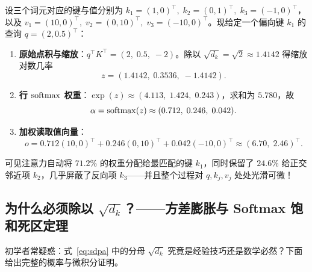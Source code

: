\begin{example}[手算迷你示例：$T=3,\; d_k=d_v=2$ 的软词典检索]
\label{ex:sdpa-hand}
设三个词元对应的键与值分别为 $k_1 = (1, 0)^\top,\; k_2 = (0, 1)^\top,\; k_3 = (-1, 0)^\top$，以及 $v_1 = (10, 0)^\top,\; v_2 = (0, 10)^\top,\; v_3 = (-10, 0)^\top$。现给定一个偏向键 $k_1$ 的查询 $q = (2, 0.5)^\top$：
\begin{enumerate}
  \item \textbf{原始点积与缩放}：$q^\top K^\top = (2,\; 0.5,\; -2)$。除以 $\sqrt{d_k} = \sqrt{2} \approx 1.4142$ 得缩放对数几率
  \[
    z = (1.4142,\; 0.3536,\; -1.4142).
  \]
  \item \textbf{行 $\operatorname{softmax}$ 权重}：$\exp(z) \approx (4.113,\; 1.424,\; 0.243)$，求和为 $5.780$，故
  \[
    \alpha = \operatorname{softmax}(z) \approx (0.712,\; 0.246,\; 0.042).
  \]
  \item \textbf{加权读取值向量}：
  \[
    o = 0.712 (10, 0)^\top + 0.246 (0, 10)^\top + 0.042 (-10, 0)^\top \approx (6.70,\; 2.46)^\top.
  \]
\end{enumerate}
可见注意力自动将 $71.2\%$ 的权重分配给最匹配的键 $k_1$，同时保留了 $24.6\%$ 给正交邻近项 $k_2$，几乎屏蔽了反向项 $k_3$——并且整个过程对 $q, k_j, v_j$ 处处光滑可微！
\end{example}

\subsection{为什么必须除以 $\sqrt{d_k}$？——方差膨胀与 Softmax 饱和死区定理}

初学者常疑惑：式~\eqref{eq:sdpa} 中的分母 $\sqrt{d_k}$ 究竟是经验技巧还是数学必然？下面给出完整的概率与微积分证明。

